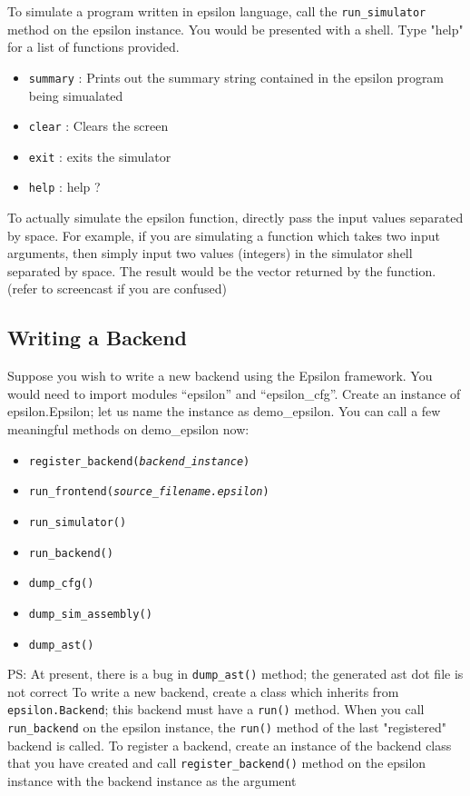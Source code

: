 \documentclass[titlepage]{article}
\begin{document}
    To simulate a program written in epsilon language, call the \texttt{run\_simulator} method on the epsilon instance. You would be
    presented with a shell. Type "help" for a list of functions provided. 
    \begin{itemize}
    \item \texttt{summary} : Prints out the summary string contained in the epsilon program being simualated
    \item \texttt{clear}   : Clears the screen
    \item \texttt{exit}    : exits the simulator
    \item \texttt{help}    : help ?
    \end{itemize}
    To actually simulate the epsilon function, directly pass the input values separated by space. For example, if you are simulating
    a function which takes two input arguments, then simply input two values (integers) in the simulator shell separated by space.
    The result would be the vector returned by the function. (refer to screencast if you are confused)
    
    \subsection{Writing a Backend}
    \label{backend}
    Suppose you wish to write a new backend using the Epsilon framework. 
    You would need to import modules ``epsilon'' and ``epsilon\_cfg''. Create an instance of epsilon.Epsilon; let us name the instance as demo\_epsilon. You can call a few meaningful methods on demo\_epsilon now:
    \begin{itemize}
    \item \texttt{register\_backend(\emph{backend\_instance})}
    \item \texttt{run\_frontend(\emph{source\_filename.epsilon})}
    \item \texttt{run\_simulator()}
    \item \texttt{run\_backend()}
    \item \texttt{dump\_cfg()}
    \item \texttt{dump\_sim\_assembly()}
    \item \texttt{dump\_ast()}
    \end{itemize}
    PS: At present, there is a bug in \texttt{dump\_ast()} method; the generated ast dot file is not correct
    To write a new backend, create a class which inherits from \texttt{epsilon.Backend}; this backend must have a \texttt{run()} method.
    When you call \texttt{run\_backend} on the epsilon instance, the \texttt{run()} method of the last "registered" backend is called.
    To register a backend, create an instance of the backend class that you have created and call \texttt{register\_backend()} method
    on the epsilon instance with the backend instance as the argument
\end{document}
